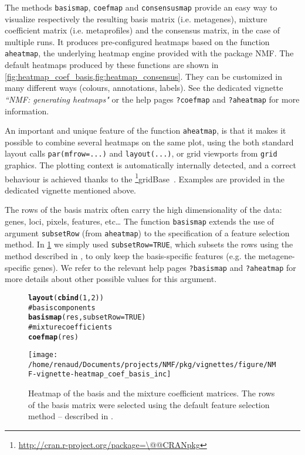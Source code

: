 \documentclass[a4paper]{article}\usepackage{graphicx, color}
\makeatletter
\def\maxwidth{ %
  \ifdim\Gin@nat@width>\linewidth
    \linewidth
  \else
    \Gin@nat@width
  \fi
}
\newcommand{\hlfunctioncall}[1]{\textcolor[rgb]{0.501960784313725,0,0.329411764705882}{\textbf{#1}}}%
\newcommand{\hlcomment}[1]{\textcolor[rgb]{0.180392156862745,0.6,0.341176470588235}{#1}}%
\newenvironment{kframe}{%
 \def\at@end@of@kframe{}%
 \ifinner\ifhmode%
  \def\at@end@of@kframe{\end{minipage}}%
  \begin{minipage}{\columnwidth}%
 \fi\fi%
 \def\FrameCommand##1{\hskip\@totalleftmargin \hskip-\fboxsep
 \colorbox{shadecolor}{##1}\hskip-\fboxsep
     \hskip-\linewidth \hskip-\@totalleftmargin \hskip\columnwidth}%
 \MakeFramed {\advance\hsize-\width
   \@totalleftmargin\z@ \linewidth\hsize
   \@setminipage}}%
 {\par\unskip\endMakeFramed%
 \at@end@of@kframe}
\newenvironment{knitrout}{}{} %
\let\code=\texttt
\newcommand{\pkgname}[1]{\textit{#1}\xspace}
\newcommand{\CRANurl}[1]{\url{http://cran.r-project.org/package=#1}}
\def\CRANpkg{\@ifstar\@CRANpkg\@@CRANpkg}
\def\@CRANpkg#1{\href{http://cran.r-project.org/package=#1}{\pkgname{#1}}\footnote{\CRANurl{#1}}}
\def\@@CRANpkg#1{\href{http://cran.r-project.org/package=#1}{\pkgname{#1}} package\footnote{\CRANurl{#1}}}
\newcommand{\citeCRANpkg}[1]{\CRANpkg{#1}~\cite{#1}}
\renewcommand{\cite}[1]{\parencite{#1}}
\makeatother
\begin{document}
The methods \code{basismap}, \code{coefmap} and \code{consensusmap} provide an
easy way to visualize respectively the resulting basis matrix (i.e. metagenes),
mixture coefficient matrix (i.e. metaprofiles) and the consensus matrix, in the
case of multiple runs.
It produces pre-configured heatmaps based on the function \code{aheatmap}, the
underlying heatmap engine provided with the package NMF. 
The default heatmaps produced by these functions are shown in
\cref{fig:heatmap_coef_basis,fig:heatmap_consensus}.
They can be customized in many different ways (colours, annotations, labels).
See the dedicated vignette \emph{``NMF: generating heatmaps"} or the help pages
\code{?coefmap} and \code{?aheatmap} for more information.

An important and unique feature of the function \code{aheatmap}, is that it
makes it possible to combine several heatmaps on the same plot, using the both
standard layout calls \texttt{par(mfrow=...)} and \texttt{layout(...)}, or grid
viewports from \texttt{grid} graphics.
The plotting context is automatically internally detected, and a correct
behaviour is achieved thanks to the \citeCRANpkg{gridBase}.
Examples are provided in the dedicated vignette mentioned above.

The rows of the basis matrix often carry the high dimensionality of the data: genes, loci, pixels, features, etc\ldots 
The function \code{basismap} extends the use of argument \code{subsetRow} (from \code{aheatmap}) to the specification of a feature selection method.
In \cref{fig:heatmap_coef_basis} we simply used \code{subsetRow=TRUE}, which subsets the rows using the method described in \cite{KimH2007}, to only keep the basis-specific features (e.g. the metagene-specific genes). 
We refer to the relevant help pages \code{?basismap} and \code{?aheatmap} for more details about other possible values for this argument.

\begin{figure}[!htbp]
\centering
\begin{knitrout}
\color{fgcolor}\begin{kframe}
\begin{alltt}
\hlfunctioncall{layout}(\hlfunctioncall{cbind}(1, 2))
\hlcomment{# basis components}
\hlfunctioncall{basismap}(res, subsetRow = TRUE)
\hlcomment{# mixture coefficients}
\hlfunctioncall{coefmap}(res)
\end{alltt}
\end{kframe}\texttt{[image: /home/renaud/Documents/projects/NMF/pkg/vignettes/figure/NMF-vignette-heatmap\_coef\_basis\_inc]} 
\end{knitrout}

\caption{Heatmap of the basis and the mixture coefficient matrices. The rows of the basis matrix were selected using the default feature selection method -- described in \cite{KimH2007}.}
\label{fig:heatmap_coef_basis}
\end{figure}
\end{document}

